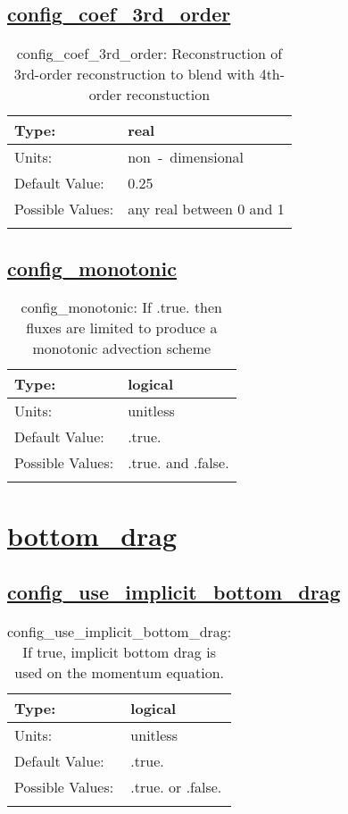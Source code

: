 \subsection[config\_coef\_3rd\_order]{\hyperref[sec:nm_tab_advection]{config\_coef\_3rd\_order}}
\label{subsec:nm_sec_config_coef_3rd_order}
\begin{center}
\begin{longtable}{| p{2.0in} || p{4.0in} |}
    \hline
    Type: & real \\
    \hline
    Units: & \si{non-dimensional} \\
    \hline
    Default Value: & 0.25 \\
    \hline
    Possible Values: & any real between 0 and 1 \\
    \hline
    \caption{config\_coef\_3rd\_order: Reconstruction of 3rd-order reconstruction to blend with 4th-order reconstuction}
\end{longtable}
\end{center}
\subsection[config\_monotonic]{\hyperref[sec:nm_tab_advection]{config\_monotonic}}
\label{subsec:nm_sec_config_monotonic}
\begin{center}
\begin{longtable}{| p{2.0in} || p{4.0in} |}
    \hline
    Type: & logical \\
    \hline
    Units: & \si{unitless} \\
    \hline
    Default Value: & .true. \\
    \hline
    Possible Values: & .true. and .false. \\
    \hline
    \caption{config\_monotonic: If .true. then fluxes are limited to produce a monotonic advection scheme}
\end{longtable}
\end{center}
\section[bottom\_drag]{\hyperref[sec:nm_tab_bottom_drag]{bottom\_drag}}
\label{sec:nm_sec_bottom_drag}
\subsection[config\_use\_implicit\_bottom\_drag]{\hyperref[sec:nm_tab_bottom_drag]{config\_use\_implicit\_bottom\_drag}}
\label{subsec:nm_sec_config_use_implicit_bottom_drag}
\begin{center}
\begin{longtable}{| p{2.0in} || p{4.0in} |}
    \hline
    Type: & logical \\
    \hline
    Units: & \si{unitless} \\
    \hline
    Default Value: & .true. \\
    \hline
    Possible Values: & .true. or .false. \\
    \hline
    \caption{config\_use\_implicit\_bottom\_drag: If true, implicit bottom drag is used on the momentum equation.}
\end{longtable}
\end{center}
